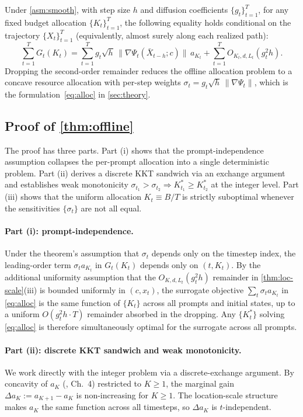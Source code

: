 \begin{corollary}
\label{cor:sde-alloc}
Under \cref{asm:smooth}, with step size $h$ and diffusion coefficients $\{g_t\}_{t=1}^T$, for any fixed budget allocation $\{K_t\}_{t=1}^T$, the following equality holds conditional on the trajectory $\{X_t\}_{t=1}^T$ (equivalently, almost surely along each realized path):
\begin{equation}
  \sum_{t=1}^{T} G_t(K_t) = \sum_{t=1}^{T} g_t\sqrt{h}\,\|\nabla\Psi_t(\bar{X}_{t-h}; c)\|\,a_{K_t} + \sum_{t=1}^{T} O_{K_t,d,L_t}(g_t^2 h).
  \label{eq:aggregate-gain}
\end{equation}
Dropping the second-order remainder reduces the offline allocation problem to a concave resource allocation with per-step weights $\sigma_t = g_t\sqrt{h}\,\|\nabla\Psi_t\|$, which is the formulation~\eqref{eq:alloc} in \cref{sec:theory}.
\end{corollary}
%
\subsection{Proof of \texorpdfstring{\cref{thm:offline}}{Theorem 6 (Offline Water-Filling)}}
\label{sec:proof-offline}
%
The proof has three parts. Part (i) shows that the prompt-independence assumption collapses the per-prompt allocation into a single deterministic problem. Part (ii) derives a discrete KKT sandwich via an exchange argument and establishes weak monotonicity $\sigma_{t_1} > \sigma_{t_2} \Rightarrow K_{t_1}^* \ge K_{t_2}^*$ at the integer level. Part (iii) shows that the uniform allocation $K_t \equiv B/T$ is strictly suboptimal whenever the sensitivities $\{\sigma_t\}$ are not all equal.
%
\paragraph{Part (i): prompt-independence.}
Under the theorem's assumption that $\sigma_t$ depends only on the timestep index, the leading-order term $\sigma_t a_{K_t}$ in $G_t(K_t)$ depends only on $(t, K_t)$. By the additional uniformity assumption that the $O_{K,d,L_t}(g_t^2 h)$ remainder in \cref{thm:loc-scale}\textup{(iii)} is bounded uniformly in $(c, x_t)$, the surrogate objective $\sum_t \sigma_t a_{K_t}$ in \cref{eq:alloc} is the same function of $\{K_t\}$ across all prompts and initial states, up to a uniform $O(g_t^2 h \cdot T)$ remainder absorbed in the dropping. Any $\{K_t^*\}$ solving \cref{eq:alloc} is therefore simultaneously optimal for the surrogate across all prompts.
%
\paragraph{Part (ii): discrete KKT sandwich and weak monotonicity.}
We work directly with the integer problem via a discrete-exchange argument. By concavity of $a_K$ (\citealt{david2003order}, Ch.~4) restricted to $K \ge 1$, the marginal gain $\Delta a_K := a_{K+1} - a_K$ is non-increasing for $K \ge 1$. The location-scale structure makes $a_K$ the same function across all timesteps, so $\Delta a_K$ is $t$-independent.

